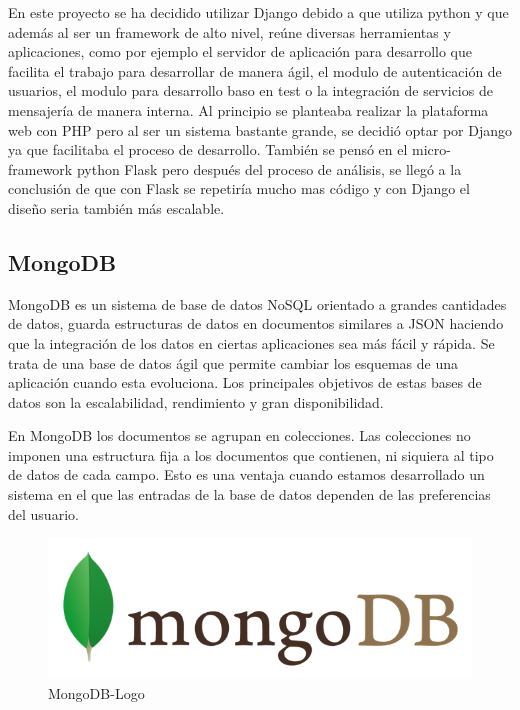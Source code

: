 \documentclass[a4paper,11pt]{book}
\begin{document}
En este proyecto se ha decidido utilizar Django debido a que utiliza python y que además al ser un framework de alto nivel, reúne diversas herramientas y aplicaciones, como por ejemplo el servidor de aplicación para desarrollo que facilita el trabajo para desarrollar de manera ágil, el modulo de autenticación de usuarios, el modulo para desarrollo baso en test o la integración de servicios de mensajería de manera interna. Al principio se planteaba realizar la plataforma web con PHP pero al ser un sistema bastante grande, se decidió optar por Django ya que facilitaba el proceso de desarrollo. También se pensó en el micro-framework python Flask pero después del proceso de análisis, se llegó a la conclusión de que con Flask\cite{fl} se repetiría mucho mas código y con Django el diseño seria también más escalable.

\subsection{MongoDB}

MongoDB\cite{mg} es un sistema de base de datos NoSQL orientado a grandes cantidades de datos, guarda estructuras de datos en documentos similares a JSON haciendo que la integración de los datos en ciertas aplicaciones sea más fácil y rápida.
Se trata de una base de datos ágil que permite cambiar los esquemas de una aplicación cuando esta evoluciona. Los principales objetivos de estas bases de datos son la escalabilidad, rendimiento y gran disponibilidad.

En MongoDB los documentos se agrupan en colecciones. Las colecciones  no imponen una estructura fija a los documentos que contienen, ni siquiera al tipo de datos de cada campo. Esto es una ventaja cuando estamos desarrollado un sistema en el que las entradas de la base de datos dependen de las preferencias del usuario.

\begin{figure}[H] 
\centering 
\includegraphics[scale=0.45]{imagenes/desarrollo_herramienta/mongo.png}
\caption{ MongoDB-Logo\cite{mongoL}  }  
\end{figure} 
\end{document}
